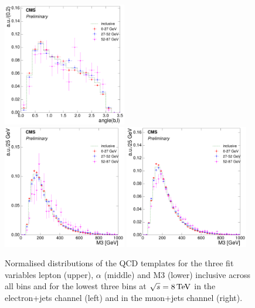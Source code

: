 \begin{figure}[hbtp]
     \includegraphics[width=0.48\textwidth]{Chapters/04_Analysis/04b_XSections/images/8TeV/fit_variables/muon/MET/angle_bl/qcd/MET_angle_bl_1orMoreBtag_QCD_template_comparison.pdf}\\
     \includegraphics[width=0.48\textwidth]{Chapters/04_Analysis/04b_XSections/images/8TeV/fit_variables/electron/MET/M3/qcd/MET_M3_0orMoreBtag_QCD_template_comparison.pdf}\hfill
     \includegraphics[width=0.48\textwidth]{Chapters/04_Analysis/04b_XSections/images/8TeV/fit_variables/muon/MET/M3/qcd/MET_M3_0orMoreBtag_QCD_template_comparison.pdf}\\
	 \caption[Normalised distributions of the QCD templates for the three fit variables in \met bins.]{Normalised
	 distributions of the QCD templates for the three fit variables lepton \abseta (upper), $\alpha$ (middle) and
	 M3 (lower) inclusive across all \met bins and for the lowest three \met bins at $\sqrt{s}=8\,\text{Te\hspace{-.08em}V}$ in the
	 electron+jets channel (left) and in the muon+jets channel (right).}
     \label{fig:fit_variable_qcd_comparisons_8TeV}
\end{figure}

